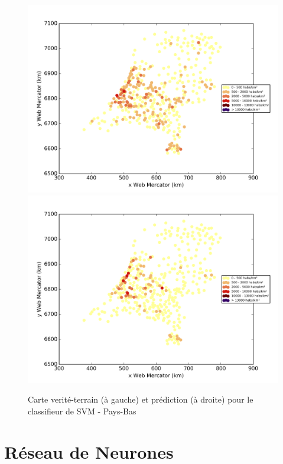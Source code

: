 \documentclass{book}
\begin{document}
\begin{figure}[H]
\centerline{
\includegraphics[scale=0.5]{../../data/Pays-Bas/test/Support_Vector_Gaussian_Classification/Support_Vector_Gaussian_Classification/density_ground_truth.png}
\includegraphics[scale=0.5]{../../data/Pays-Bas/test/Support_Vector_Gaussian_Classification/Support_Vector_Gaussian_Classification/density_classification.png}
}
\caption{Carte verité-terrain (à gauche) et prédiction (à droite) pour le classifieur de SVM - Pays-Bas}
\label{svm_carte_pays-bas}
\end{figure}


\section{Réseau de Neurones}
\end{document}
